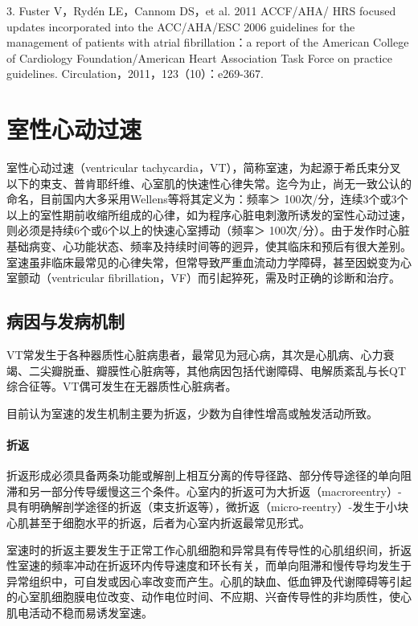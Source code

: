 3. Fuster V，Rydén LE，Cannom DS，et al. 2011 ACCF/AHA/ HRS focused
updates incorporated into the ACC/AHA/ESC 2006 guidelines for the
management of patients with atrial fibrillation：a report of the
American College of Cardiology Foundation/American Heart Association
Task Force on practice guidelines.
Circulation，2011，123（10）：e269-367.

\protect\hypertarget{text00292.html}{}{}

\section{室性心动过速}

室性心动过速（ventricular
tachycardia，VT），简称室速，为起源于希氏束分叉以下的束支、普肯耶纤维、心室肌的快速性心律失常。迄今为止，尚无一致公认的命名，目前国内大多采用Wellens等将其定义为：频率＞
100次/分，连续3个或3个以上的室性期前收缩所组成的心律，如为程序心脏电刺激所诱发的室性心动过速，则必须是持续6个或6个以上的快速心室搏动（频率＞
100次/分）。由于发作时心脏基础病变、心功能状态、频率及持续时间等的迥异，使其临床和预后有很大差别。室速虽非临床最常见的心律失常，但常导致严重血流动力学障碍，甚至因蜕变为心室颤动（ventricular
fibrillation，VF）而引起猝死，需及时正确的诊断和治疗。

\subsection{病因与发病机制}

VT常发生于各种器质性心脏病患者，最常见为冠心病，其次是心肌病、心力衰竭、二尖瓣脱垂、瓣膜性心脏病等，其他病因包括代谢障碍、电解质紊乱与长QT综合征等。VT偶可发生在无器质性心脏病者。

目前认为室速的发生机制主要为折返，少数为自律性增高或触发活动所致。

\paragraph{折返}

折返形成必须具备两条功能或解剖上相互分离的传导径路、部分传导途径的单向阻滞和另一部分传导缓慢这三个条件。心室内的折返可为大折返（macroreentry）-具有明确解剖学途径的折返（束支折返等），微折返（micro-reentry）-发生于小块心肌甚至于细胞水平的折返，后者为心室内折返最常见形式。

室速时的折返主要发生于正常工作心肌细胞和异常具有传导性的心肌组织间，折返性室速的频率冲动在折返环内传导速度和环长有关，而单向阻滞和慢传导均发生于异常组织中，可自发或因心率改变而产生。心肌的缺血、低血钾及代谢障碍等引起的心室肌细胞膜电位改变、动作电位时间、不应期、兴奋传导性的非均质性，使心肌电活动不稳而易诱发室速。

